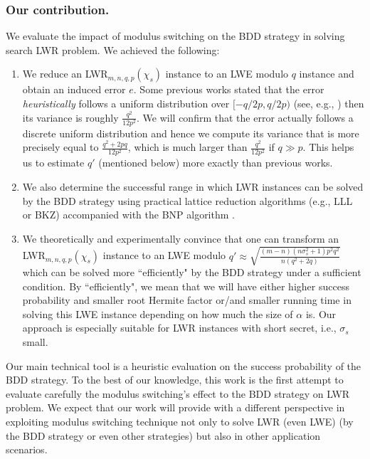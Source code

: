 \documentclass[runningheads]{llncs}
\begin{document}
\subsubsection{Our contribution.} We evaluate the impact of modulus switching on the BDD strategy in solving search LWR problem. We achieved the following:
\begin{enumerate}
	\item We reduce an LWR$_{m,n,q,p}(\chi_s)$ instance to an LWE modulo $q$ instance and obtain an induced error $e$.  Some previous works stated that the error \textit{heuristically} follows a uniform distribution over $[-q/2p, q/2p)$ (see, e.g., \cite[Sec. 4.2.1]{CKLS16}) then its variance is roughly $\frac{q^2}{12p^2}$. We will confirm that the error actually  follows a discrete uniform distribution and hence we compute its variance that is more precisely equal to $\frac{q^2+2pq}{12p^2}$, which is much larger than $\frac{q^2}{12p^2}$ if $q\gg p$. This helps us to estimate $q'$ (mentioned below) more exactly than previous works. 

\item We also determine the successful range in which LWR instances can be solved by the BDD strategy using practical lattice reduction algorithms (e.g., LLL or BKZ) accompanied with the BNP algorithm \cite{Bab86}.

\item We theoretically and experimentally convince that one can transform an LWR$_{m,n,q,p}(\chi_s)$ instance to an LWE modulo $q'\approx \sqrt{\frac{(m-n)(n\sigma_s^2+1)p^2q^2}{n(q^2+2q)}}$ which can be solved more ``efficiently" by the BDD strategy under a sufficient condition. By ``efficiently", we mean that we will have either higher success probability and smaller root Hermite factor or/and smaller running time in solving this LWE instance depending on how much the size of $\alpha$  is. Our approach is especially suitable for LWR instances with short secret, i.e., $\sigma_s$ small.

\end{enumerate}

Our main technical tool is a heuristic evaluation on the success probability of the BDD strategy. To the best of our knowledge, this work is the first attempt to evaluate carefully the modulus switching's effect to the BDD strategy on LWR problem. We expect that our work will provide with a different perspective in exploiting modulus switching technique not only to solve LWR (even LWE) (by the BDD strategy or even other strategies) but also in other application scenarios.
\end{document}

